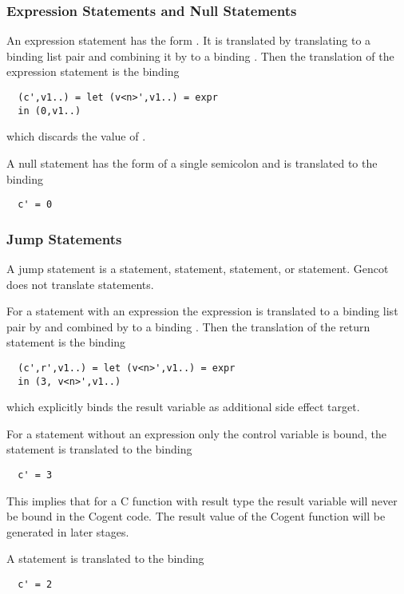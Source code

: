 \subsubsection{Expression Statements and Null Statements}

An expression statement has the form . It is translated by translating  to a binding list pair and 
combining it by  to a binding . Then the translation of the expression statement
is the binding
\begin{verbatim}
  (c',v1..) = let (v<n>',v1..) = expr
  in (0,v1..)
\end{verbatim}
which discards the value  of .

A null statement has the form of a single semicolon \code{;} and is translated to the
binding
\begin{verbatim}
  c' = 0
\end{verbatim}

\subsubsection{Jump Statements}

A jump statement is a  statement,  statement,  statement, or  statement.
Gencot does not translate  statements.

For a  statement with an expression the expression is translated to a binding list pair by  and 
combined by  to a binding . Then the translation of the return statement
is the binding
\begin{verbatim}
  (c',r',v1..) = let (v<n>',v1..) = expr
  in (3, v<n>',v1..)
\end{verbatim}
which explicitly binds the result variable  as additional side effect target. 

For a  statement without an expression only the control variable is bound, the statement is translated to the 
binding
\begin{verbatim}
  c' = 3
\end{verbatim}
This implies that for a C function with result type  the result variable will never be bound in
the Cogent code. The result value of the Cogent function will be generated in later stages.

A  statement is translated to the binding
\begin{verbatim}
  c' = 2
\end{verbatim}

